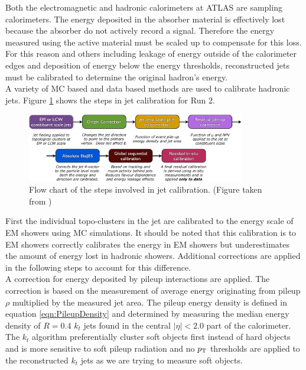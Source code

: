 \indent Both the electromagnetic and hadronic calorimeters at ATLAS are sampling calorimeters.  The energy deposited in the absorber material is effectively lost because the absorber do not actively record a signal.  Therefore the energy measured using the active material must be scaled up to compensate for this loss.  For this reason and others including leakage of energy outside of the calorimeter edges and deposition of energy below the energy thresholds, reconstructed jets must be calibrated to determine the original hadron's energy.  \\

\indent  A variety of MC based and data based methods are used to calibrate hadronic jets.  Figure \ref{fig:jetCalibFlow} shows the steps in jet calibration for Run 2.\cite{Calibartion13TeV} \\

\begin{figure}[htb]
  \begin{center}
    \includegraphics[width=0.85\textwidth]{figures/JetCalib/JetCalibFlow.png}\hspace{0.05\textwidth}
\end{center}
\caption{Flow chart of the steps involved in jet calibration. (Figure taken from \cite{Calibartion13TeV}) }
\label{fig:jetCalibFlow} 
\end{figure}

\indent First the individual topo-clusters in the jet are calibrated to the energy scale of EM showers using MC simulations.\cite{topoCalib}  It should be noted that this calibration is to EM showers correctly calibrates the energy in EM showers but underestimates the amount of energy lost in hadronic showers.  Additional corrections are applied in the following steps to account for this difference. \\

\indent A correction for energy deposited by pileup interactions are applied.\cite{pileupsub}  The correction is based on the measurement of average energy originating from pileup $\rho$ multiplied by the measured jet area.  The pileup energy density is defined in equation \ref{eqn:PileupDensity} and determined by measuring the median energy density of $R=0.4$ $k_t$ jets found in the central $|\eta|<2.0$ part of the calorimeter.  The $k_t$ algorithm preferentially cluster soft objects first instead of hard objects and is more sensitive to soft pileup radiation and no $p_{\mathrm{T}}$ thresholds are applied to the reconstructed $k_t$ jets as we are trying to measure soft objects.  \\

